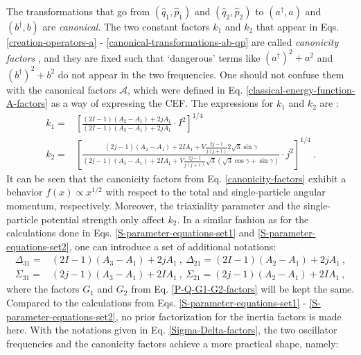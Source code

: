 The transformations that go from $(\hat{q}_1,\hat{p}_1)$ and $(\hat{q}_2,\hat{p}_2)$ to $(a^\dagger, a)$ and $(b^\dagger, b)$ are \emph{canonical}. The two constant factors $k_1$ and $k_2$ that appear in Eqs. \ref{creation-operators-a} - \ref{canonical-transformations-ab-qp} are called \emph{canonicity factors} \cite{raduta2017semiclassical}, and they are fixed such that `dangerous' terms like $(a^\dagger)^2+a^2$ and $(b^\dagger)^2+b^2$ do not appear in the two frequencies. One should not confuse them with the canonical factors $\mathcal{A}$, which were defined in Eq. \ref{classical-energy-function-A-factors} as a way of expressing the CEF. The expressions for $k_1$ and $k_2$ are \cite{raduta2020approach}:
\begin{align}
    k_1=&\left[\frac{(2I-1)(A_2-A_1)+2jA_1}{(2I-1)(A_3-A_1)+2jA_1}\cdot I^2\right]^{1/4}\, \nonumber\\
    k_2=&\left[\frac{(2j-1)(A_2-A_1)+2IA_1+V\frac{2j-1}{j(j+1)}2\sqrt{3}\sin\gamma}{(2j-1)(A_3-A_1)+2IA_1+V\frac{2j-1}{j(j+1)}\sqrt{3}\left(\sqrt{3}\cos\gamma+\sin\gamma\right)}\cdot j^2\right]^{1/4}\ .
    \label{canonicity-factors}
\end{align}
It can be seen that the canonicity factors from Eq. \ref{canonicity-factors} exhibit a behavior $f(x)\propto x^{1/2}$ with respect to the total and single-particle angular momentum, respectively. Moreover, the triaxiality parameter and the single-particle potential strength only affect $k_2$.
In a similar fashion as for the calculations done in Eqs. \ref{S-parameter-equations-set1} and \ref{S-parameter-equations-set2}, one can introduce a set of additional notations:
\begin{align}
    \Delta_{31}=&(2I-1)(A_3-A_1)+2jA_1\ ,\ \Delta_{21}=(2I-1)(A_2-A_1)+2jA_1\ ,\nonumber\\
    \Sigma_{31}=&(2j-1)(A_3-A_1)+2IA_1\ ,\ \Sigma_{21}=(2j-1)(A_2-A_1)+2IA_1\ ,
    \label{Sigma-Delta-factors}
\end{align}
where the factors $G_1$ and $G_2$ from Eq. \ref{P-Q-G1-G2-factors} will be kept the same. Compared to the calculations from Eqs. \ref{S-parameter-equations-set1} - \ref{S-parameter-equations-set2}, no prior factorization for the inertia factors is made here. With the notations given in Eq. \ref{Sigma-Delta-factors}, the two oscillator frequencies and the canonicity factors achieve a more practical shape, namely:
